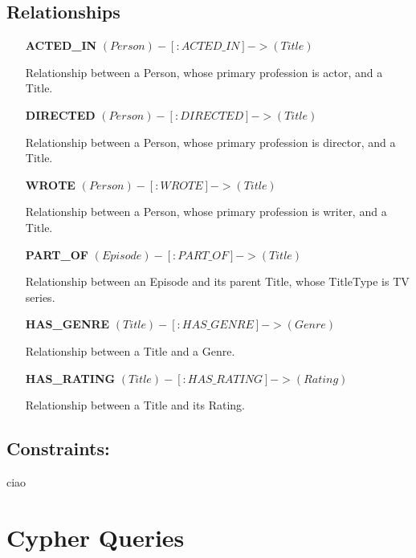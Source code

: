 \documentclass[a4paper,12pt]{article}
\begin{document}
\subsection{Relationships}
\begin{itemize}[noitemsep]
  
    \item[\textbf{ACTED\_IN}] $(Person)-[:ACTED\_IN]->(Title)$
    
    Relationship between a Person, whose primary profession is actor, and a Title.
    \item[\textbf{DIRECTED}] $(Person)-[:DIRECTED]->(Title)$
    
    Relationship between a Person, whose primary profession is director, and a Title.
    \item[\textbf{WROTE}] $(Person)-[:WROTE]->(Title)$
    
    Relationship between a Person, whose primary profession is writer, and a Title.
    \item[\textbf{PART\_OF}] $(Episode)-[:PART\_OF]->(Title)$
    
    Relationship between an Episode and its parent Title, whose TitleType is TV series.
    \item[\textbf{HAS\_GENRE}] $(Title)-[:HAS\_GENRE]->(Genre)$
    
    Relationship between a Title and a Genre.
    \item[\textbf{HAS\_RATING}] $(Title)-[:HAS\_RATING]->(Rating)$
    
    Relationship between a Title and its Rating.

    
\end{itemize}


\subsection{Constraints:}
ciao

\section{Cypher Queries}
\end{document}
